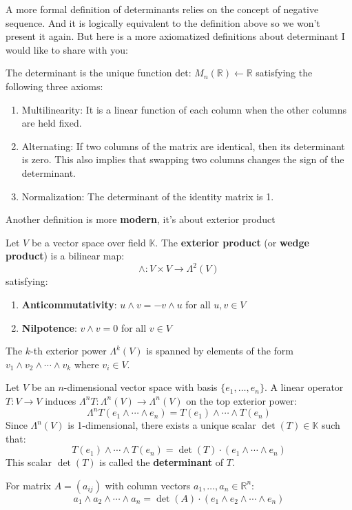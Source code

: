 \documentclass[oneside]{book}
\begin{document}
A more formal definition of determinants relies on the concept of negative sequence. And it is logically equivalent to the definition above so we won't present it again. But here is a more axiomatized definitions about determinant I would like to share with you:

\begin{definition}
The determinant is the unique function det: $M_n(\mathbb{R}) \leftarrow \mathbb{R}$ satisfying the following three axioms:
\begin{enumerate}
    \item Multilinearity: It is a linear function of each column when the other columns are held fixed.
    \item Alternating: If two columns of the matrix are identical, then its determinant is zero. This also implies that swapping two columns changes the sign of the determinant.
    \item Normalization: The determinant of the identity matrix is 1.
\end{enumerate}
\end{definition}

Another definition is more \textbf{modern}, it's about exterior product

\begin{definition}
Let $V$ be a vector space over field $\mathbb{K}$. The \textbf{exterior product} (or \textbf{wedge product}) is a bilinear map:
\[
\wedge: V \times V \to \Lambda^2(V)
\]
satisfying:
\begin{enumerate}
    \item \textbf{Anticommutativity}: $u \wedge v = -v \wedge u$ for all $u, v \in V$
    \item \textbf{Nilpotence}: $v \wedge v = 0$ for all $v \in V$
\end{enumerate}
The $k$-th exterior power $\Lambda^k(V)$ is spanned by elements of the form $v_1 \wedge v_2 \wedge \cdots \wedge v_k$ where $v_i \in V$.
\end{definition}

\begin{definition}
Let $V$ be an $n$-dimensional vector space with basis $\{e_1, \ldots, e_n\}$. A linear operator $T: V \to V$ induces $\Lambda^nT: \Lambda^n(V) \to \Lambda^n(V)$ on the top exterior power:
\[
\Lambda^nT(e_1 \wedge \cdots \wedge e_n) = T(e_1) \wedge \cdots \wedge T(e_n)
\]
Since $\Lambda^n(V)$ is 1-dimensional, there exists a unique scalar $\det(T) \in \mathbb{K}$ such that:
\[
T(e_1) \wedge \cdots \wedge T(e_n) = \det(T) \cdot (e_1 \wedge \cdots \wedge e_n)
\]
This scalar $\det(T)$ is called the \textbf{determinant} of $T$.

For matrix $A = (a_{ij})$ with column vectors $a_1, \ldots, a_n \in \mathbb{R}^n$:
\[
a_1 \wedge a_2 \wedge \cdots \wedge a_n = \det(A) \cdot (e_1 \wedge e_2 \wedge \cdots \wedge e_n)
\]
\end{definition}
\end{document}
